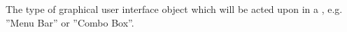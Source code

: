 \item[Component Type]{
The type of graphical user interface object which will be acted upon in a 
\gdstep{}, e.g. ''Menu Bar'' or ''Combo Box''.
}
